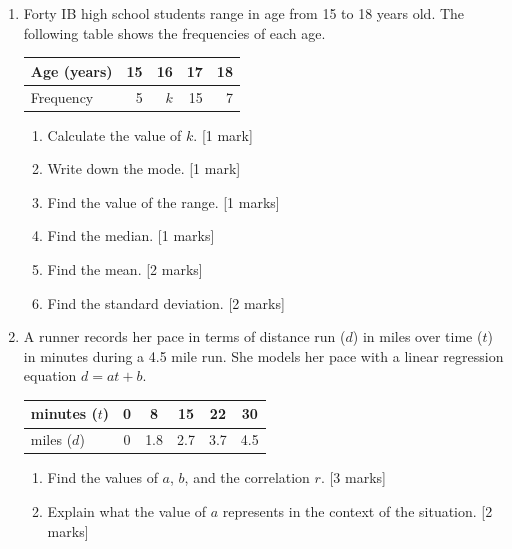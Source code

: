 \documentclass[12pt, twoside]{article}
\begin{document}
\begin{enumerate}
\newpage
    \item Forty IB high school students range in age from 15 to 18 years old. The following table shows the frequencies of each age.
        \begin{center}
            \begin{tabular}{|l|r|r|r|r|}
                \hline
                Age (years) & 15 & 16 & 17 & 18\\ 
                \hline 
                Frequency & 5 & $k$ & 15 & 7\\ 
                \hline 
                \end{tabular}      
        \end{center}
        \begin{enumerate}[itemsep=0.8cm]
            \item Calculate the value of $k$. \hfill [1 mark]
            \item Write down the mode. \hfill [1 mark]
            \item Find the value of the range. \hfill [1 marks]
            \item Find the median. \hfill [1 marks]
            \item Find the mean. \hfill [2 marks]
            \item Find the standard deviation. \hfill [2 marks]
        \end{enumerate} \vspace{0.5cm}

    \item A runner records her pace in terms of distance run ($d$) in miles over time ($t$) in minutes during a 4.5 mile run. She models her pace with a linear regression equation $d=at+b$.
        \begin{center}
        \begin{tabular}{|l|c|c|c|c|c|}
            \hline
            minutes ($t$) & 0 & 8 & 15 & 22 & 30 \\ 
            \hline 
            miles ($d$) & 0 & 1.8 & 2.7 & 3.7 & 4.5 \\ 
            \hline 
            \end{tabular}
        \end{center}
        \begin{enumerate}[itemsep=3.5cm]
            \item Find the values of $a$, $b$, and the correlation $r$. \hfill [3 marks]
            \item Explain what the value of $a$ represents in the context of the situation. \hfill [2 marks]
        \end{enumerate}


\end{enumerate}
\end{document}
